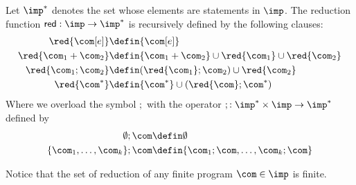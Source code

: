 \begin{definition}[Reducts]
  Let \(\imp^*\) denotes the set whose elements are statements in
  \(\imp\). The reduction function \(\mathsf{red} : \imp \to \imp^*\)
  is recursively defined by the following clauses:
  \begin{align*}
    \red{\com[e]} & \defin \{\com[e]\} \\
    \red{\com_1 + \com_2} & \defin \{\com_1 + \com_2\} \cup \red{\com_1} \cup \red{\com_2} \\
    \red{\com_1 ; \com_2} & \defin (\red{\com_1} ; \com_2) \cup \red{\com_2} \\
    \red{\com^*} & \defin \{\com^*\} \cup (\red{\com} ; \com^*)
  \end{align*}
  Where we overload the symbol \(\mathds{;}\) with the operator
  \(; : \imp^* \times \imp \to \imp^*\) defined by
  \begin{align*}
    \emptyset ; \com & \defin \emptyset \\
    \{\com_1, \dots, \com_k\} ; \com & \defin \{\com_1;\com, \dots, \com_k;\com\}
  \end{align*}
\end{definition}
\noindent
Notice that the set of reduction of any finite program \(\com\in\imp\)
is finite.
